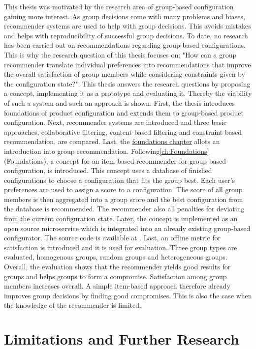 This thesis was motivated by the research area of group-based configuration gaining more interest. As group decisions come with many problems and biases, recommender systems are used  to help with group decisions. This avoids mistakes and helps with reproducibility of successful group decisions. To date, no research has been carried out on recommendations regarding group-based configurations. This is why the research question of this thesis focuses on: "How can a group recommender translate individual preferences into recommendations that improve the overall satisfaction of group members while considering constraints given by the configuration state?". This thesis answers the research questions by proposing a concept, implementing it as a prototype and evaluating it. Thereby the viability of such a system and such an approach is shown.
First, the thesis introduces foundations of product configuration and extends them to group-based product configuration. Next, recommender systems are introduced and three basic approaches, collaborative filtering, content-based filtering and constraint based recommendation, are compared. Last, the \hyperref[ch:Foundations]{foundations chapter} allots an introduction into group recommendation.
Following\autoref{ch:Foundations} (Foundations), a concept for an item-based recommender for group-based configuration, is introduced. This concept uses a database of finished configurations to choose a configuration that fits the group best. Each user's preferences are used to assign a score to a configuration. The score of all group members is then aggregated into a group score and the best configuration from the database is recommended. The recommender also all penalties for deviating from the current configuration state.
Later, the concept is implemented as an open source microservice which is integrated into an already existing group-based configurator. The source code is available at \cite{kuchelmeister13hannes11BachelorThesis}.
Last, an offline metric for satisfaction is introduced and it is used for evaluation. Three group types are evaluated, homogenous groups, random groups and heterogeneous groups. Overall, the evaluation shows that the recommender yields good results for groups and helps groups to form a compromise. Satisfaction among group members increases overall. A simple item-based approach therefore  already improves group decisions by finding good compromises. This is also the case when the knowledge of the recommender is limited.

\section{Limitations and Further Research}
\label{sec:Conclusion:LimitationsFurtherResearch}

